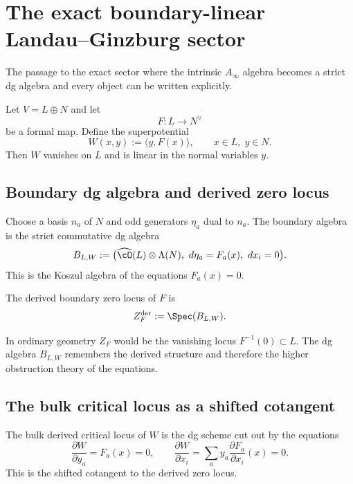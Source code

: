 \section{The exact boundary-linear Landau--Ginzburg sector}\label{sec:boundary-linear}

The passage to the exact sector where the intrinsic $A_\infty$ algebra becomes a strict dg algebra and every object can be written explicitly.

Let $V=L\oplus N$ and let
\[
F:L\longrightarrow N^\vee
\]
be a formal map. Define the superpotential
\[
W(x,y):=\langle y, F(x)\rangle,
\qquad
x\in L,\; y\in N.
\]
Then $W$ vanishes on $L$ and is linear in the normal variables $y$.

\subsection{Boundary dg algebra and derived zero locus}

Choose a basis $n_a$ of $N$ and odd generators $\eta_a$ dual to $n_a$. The boundary algebra is the strict commutative dg algebra
\begin{equation}\label{eq:boundary-linear-dga}
B_{L,W}
:=
\bigl(\widehat{\cO}(L)\ot \Lambda(N),\ d\eta_a=F_a(x),\ dx_i=0\bigr).
\end{equation}
This is the Koszul algebra of the equations $F_a(x)=0$.

\begin{definition}
The derived boundary zero locus of $F$ is
\[
Z_F^{\der}:=\Spec(B_{L,W}).
\]
\end{definition}

\begin{remark}
In ordinary geometry $Z_F$ would be the vanishing locus $F^{-1}(0)\subset L$. The dg algebra $B_{L,W}$ remembers the derived structure and therefore the higher obstruction theory of the equations.
\end{remark}

\subsection{The bulk critical locus as a shifted cotangent}

The bulk derived critical locus of $W$ is the dg scheme cut out by the equations
\[
\frac{\partial W}{\partial y_a}=F_a(x)=0,
\qquad
\frac{\partial W}{\partial x_i}
=
\sum_a y_a\frac{\partial F_a}{\partial x_i}(x)=0.
\]
This is the shifted cotangent to the derived zero locus.

